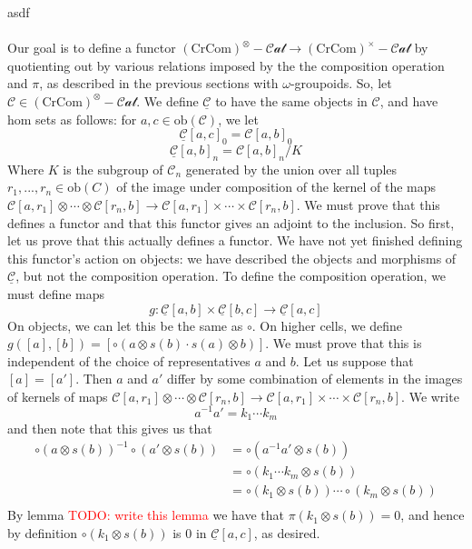 \documentclass[12pt]{article}
\theoremstyle{definition}
\newcommand{\TODO}[1]{\textcolor{red}{TODO: {#1}}}
\newcommand{\C}{\mathcal{C}}
\newcommand{\crcom}{\text{CrCom}}
\newcommand{\cartcrossedcat}{(\crcom)^\times-\mathcal{Cat}}
\newcommand{\tensorcrossedcat}{(\crcom)^\otimes-\mathcal{Cat}}
\newcommand{\tencart}[1]{\underline{#1}}
\newcommand{\ob}{\text{ob}}
\begin{document}
asdf
\\\\
Our goal is to define a functor $\tensorcrossedcat \to \cartcrossedcat$ by quotienting out by various relations imposed by the the composition operation and $\pi$, as described in the previous sections with $\omega$-groupoids. So, let $\C \in \tensorcrossedcat$. 
We define $\tencart{\C}$ to have the same objects in $\C$, and have hom sets as follows: for $a,c \in \ob(\C)$, we let 
$$
\tencart{\C}[a,c]_0 = \C[a,b]_0
$$
$$\tencart{\C}[a,b]_n = \C[a,b]_n/K$$
Where $K$ is the subgroup of $\C_n$ generated by the union over all tuples $r_1,...,r_n \in \ob(C)$ of the image under composition of the kernel of the maps $\C[a,r_1] \otimes \cdots \otimes \C[r_n,b] \to \C[a,r_1] \times \cdots \times \C[r_n,b]$. We must prove that this defines a functor and that this functor gives an adjoint to the inclusion. 
So first, let us prove that this actually defines a functor. 
We have not yet finished defining this functor's action on objects: we have described the objects and morphisms of $\tencart{\C}$, but not the composition operation. To define the composition operation, we must define maps 
$$g: \tencart{\C}[a,b] \times \tencart{\C}[b,c] \to \tencart{\C}[a,c]$$
On objects, we can let this be the same as $\circ$. On higher cells, we define $g([a],[b]) = [\circ(a\otimes s(b) \cdot s(a) \otimes b)]$. 
We must prove that this is independent of the choice of representatives $a$ and $b$. Let us suppose that $[a] = [a']$. 
Then $a$ and $a'$ differ by some combination of elements in the images of kernels of maps $\C[a,r_1] \otimes \cdots \otimes \C[r_n,b] \to \C[a,r_1] \times \cdots \times \C[r_n,b]$. We write
$$a^{-1}a' = k_1 \cdots k_m$$
and then note that this gives us that 
\begin{align*}
	\circ(a \otimes s(b))^{-1} \circ(a' \otimes s(b)) &= \circ(a^{-1} a' \otimes s(b)) \\
	&= \circ(k_1 \cdots k_m \otimes s(b)) \\
	&= \circ(k_1 \otimes s(b)) \cdots \circ (k_m \otimes s(b)) \\
\end{align*}
By lemma \TODO{write this lemma} we have that $\pi(k_1 \otimes s(b)) = 0$, and hence by definition $\circ(k_1 \otimes s(b))$ is $0$ in $\tencart{\C}[a,c]$, as desired. 
%
\end{document}

